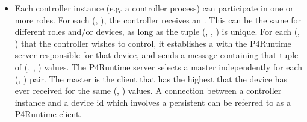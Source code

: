 \documentclass[11pt]{article}
\begin{document}
{\begin{itemize}
\item{}
Each controller instance (e.g. a controller process) can participate in one or
more roles. For each (, ), the controller receives an
. This  can be the same for different roles and/or
devices, as long as the tuple (, , ) is
unique. For each (, ) that the controller wishes to
control, it establishes a  with the P4Runtime server
responsible for that device, and sends a  message
containing that tuple of (, , ) values. The
P4Runtime server selects a master independently for each (,
) pair. The master is the client that has the highest 
that the device has ever received for the same (,
) values.  A connection between a controller instance and a device id
\textemdash{} which involves a persistent  \textemdash{} can be referred to as a
P4Runtime client.%


\end{itemize}}
\end{document}
